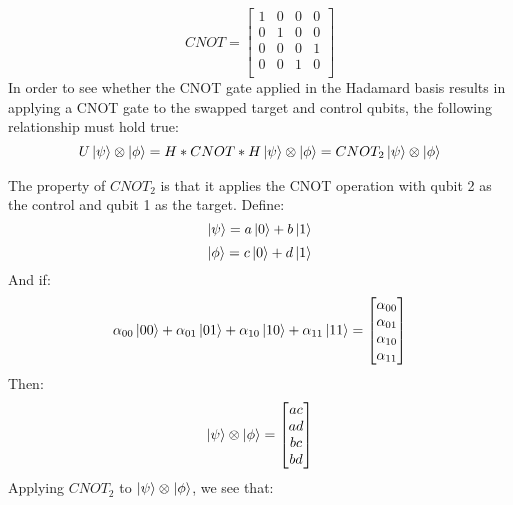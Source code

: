 \documentclass{article}
\newcommand{\tens}[1]{%
  \mathbin{\mathop{\otimes}\displaylimits_{#1}}%
}
\begin{document}
\begin{enumerate}
        \begin{equation}
            CNOT = 
            \begin{bmatrix}
            1 &    0  &   0    & 0\\
            0   & 1    & 0 &    0\\
            0    & 0   & 0   & 1\\
             0   & 0 &    1   &  0\\
            \end{bmatrix}
        \end{equation}
        In order to see whether the CNOT gate applied in the Hadamard basis results in applying a CNOT gate to the swapped target and control qubits, the following relationship must hold true:
        \begin{equation}
            U\ket{\psi}\tens{}\ket{\phi} = H*CNOT*H \ket{\psi}\tens{}\ket{\phi} = CNOT_{2} \ket{\psi}\tens{}\ket{\phi} 
        \end{equation}
        The property of $CNOT_{2}$ is that it applies the CNOT operation with qubit 2 as the control and qubit 1 as the target.
        Define:
        \begin{equation}
            \ket{\psi} = a \ket{0} + b\ket{1}
        \end{equation}
        \begin{equation}
            \ket{\phi} = c \ket{0} + d\ket{1}
        \end{equation}
        And if:
        \begin{equation}
            \alpha_{00}\ket{00}+\alpha_{01}\ket{01}+\alpha_{10}\ket{10}+\alpha_{11}\ket{11} = \begin{bmatrix}
            \alpha_{00}\\\alpha_{01}\\\alpha_{10}\\\alpha_{11}
            \end{bmatrix}
        \end{equation}
        Then:
        \begin{equation}
            \ket{\psi}\tens{}\ket{\phi} = \begin{bmatrix}
            ac\\ad\\bc\\bd
            \end{bmatrix}
        \end{equation}
        Applying $CNOT_{2}$ to $\ket{\psi}\tens{}\ket{\phi}$, we see that:
        \begin{equation}

\end{equation}
\end{enumerate}
\end{document}
